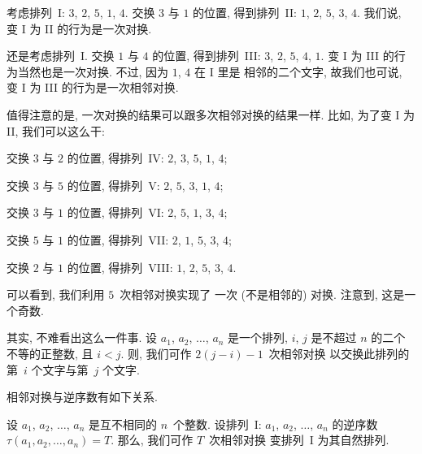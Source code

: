 \begin{example}
    考虑排列~I: \(3\), \(2\), \(5\), \(1\), \(4\).
    交换 \(3\) 与 \(1\) 的位置,
    得到排列~II: \(1\), \(2\), \(5\), \(3\), \(4\).
    我们说, 变 I 为 II 的行为是一次对换.

    还是考虑排列~I.
    交换 \(1\) 与 \(4\) 的位置,
    得到排列~III: \(3\), \(2\), \(5\), \(4\), \(1\).
    变 I 为 III 的行为当然也是一次对换.
    不过, 因为 \(1\), \(4\) 在 I 里是%
    相邻的二个文字,
    故我们也可说,
    变 I 为 III 的行为是一次相邻对换.

    值得注意的是,
    一次对换的结果可以跟多次相邻对换的结果一样.
    比如, 为了变 I 为 II,
    我们可以这么干:

    交换 \(3\) 与 \(2\) 的位置,
    得排列~IV: \(2\), \(3\), \(5\), \(1\), \(4\);

    交换 \(3\) 与 \(5\) 的位置,
    得排列~V: \(2\), \(5\), \(3\), \(1\), \(4\);

    交换 \(3\) 与 \(1\) 的位置,
    得排列~VI: \(2\), \(5\), \(1\), \(3\), \(4\);

    交换 \(5\) 与 \(1\) 的位置,
    得排列~VII: \(2\), \(1\), \(5\), \(3\), \(4\);

    交换 \(2\) 与 \(1\) 的位置,
    得排列~VIII: \(1\), \(2\), \(5\), \(3\), \(4\).

    可以看到,
    我们利用 \(5\)~次相邻对换实现了%
    一次 (不是相邻的) 对换.
    注意到, 这是一个奇数.

    其实, 不难看出这么一件事.
    设 \(a_1\), \(a_2\), \(\dots\), \(a_n\) 是一个排列,
    \(i\), \(j\) 是不超过 \(n\) 的二个不等的正整数,
    且 \(i < j\).
    则, 我们可作 \(2(j - i) - 1\)~次相邻对换%
    以交换此排列的第~\(i\) 个文字与第~\(j\) 个文字.
\end{example}

相邻对换与逆序数有如下关系.

\begin{theorem}
    设 \(a_1\), \(a_2\), \(\dots\), \(a_n\)
    是互不相同的 \(n\)~个整数.
    设排列~I: \(a_1\), \(a_2\), \(\dots\), \(a_n\)
    的逆序数 \(\tau (a_1, a_2, \dots, a_n) = T\).
    那么, 我们可作 \(T\)~次相邻对换%
    变排列~I 为其自然排列.
\end{theorem}


